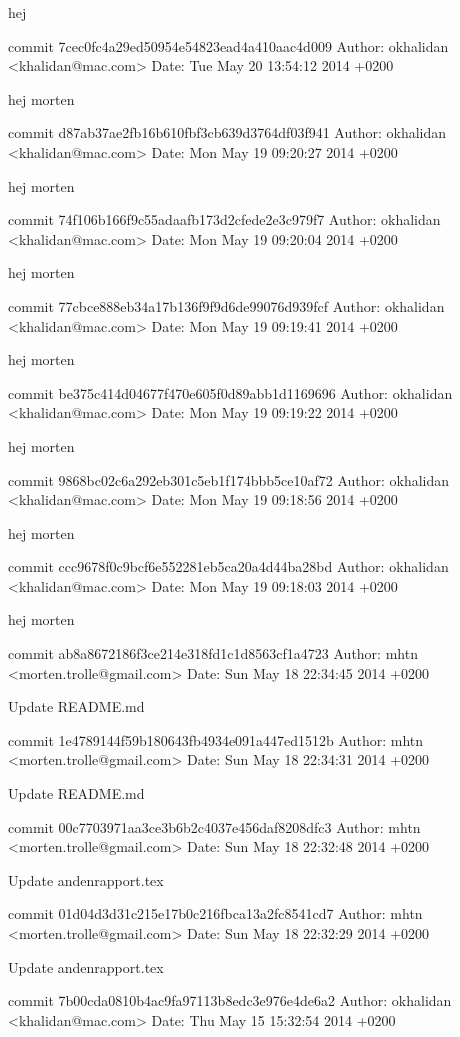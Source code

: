 \documentclass[12pt]{article}   %
\begin{document}
    hej

commit 7cec0fc4a29ed50954e54823ead4a410aac4d009
Author: okhalidan <khalidan@mac.com>
Date:   Tue May 20 13:54:12 2014 +0200

    hej morten

commit d87ab37ae2fb16b610fbf3cb639d3764df03f941
Author: okhalidan <khalidan@mac.com>
Date:   Mon May 19 09:20:27 2014 +0200

    hej morten

commit 74f106b166f9c55adaafb173d2cfede2e3c979f7
Author: okhalidan <khalidan@mac.com>
Date:   Mon May 19 09:20:04 2014 +0200

    hej morten

commit 77cbce888eb34a17b136f9f9d6de99076d939fcf
Author: okhalidan <khalidan@mac.com>
Date:   Mon May 19 09:19:41 2014 +0200

    hej morten

commit be375c414d04677f470e605f0d89abb1d1169696
Author: okhalidan <khalidan@mac.com>
Date:   Mon May 19 09:19:22 2014 +0200

    hej morten

commit 9868bc02c6a292eb301c5eb1f174bbb5ce10af72
Author: okhalidan <khalidan@mac.com>
Date:   Mon May 19 09:18:56 2014 +0200

    hej morten

commit ccc9678f0c9bcf6e552281eb5ca20a4d44ba28bd
Author: okhalidan <khalidan@mac.com>
Date:   Mon May 19 09:18:03 2014 +0200

    hej morten

commit ab8a8672186f3ce214e318fd1c1d8563cf1a4723
Author: mhtn <morten.trolle@gmail.com>
Date:   Sun May 18 22:34:45 2014 +0200

    Update README.md

commit 1e4789144f59b180643fb4934e091a447ed1512b
Author: mhtn <morten.trolle@gmail.com>
Date:   Sun May 18 22:34:31 2014 +0200

    Update README.md

commit 00c7703971aa3ce3b6b2c4037e456daf8208dfc3
Author: mhtn <morten.trolle@gmail.com>
Date:   Sun May 18 22:32:48 2014 +0200

    Update andenrapport.tex

commit 01d04d3d31c215e17b0c216fbca13a2fc8541cd7
Author: mhtn <morten.trolle@gmail.com>
Date:   Sun May 18 22:32:29 2014 +0200

    Update andenrapport.tex

commit 7b00cda0810b4ac9fa97113b8edc3e976e4de6a2
Author: okhalidan <khalidan@mac.com>
Date:   Thu May 15 15:32:54 2014 +0200
\end{document}
